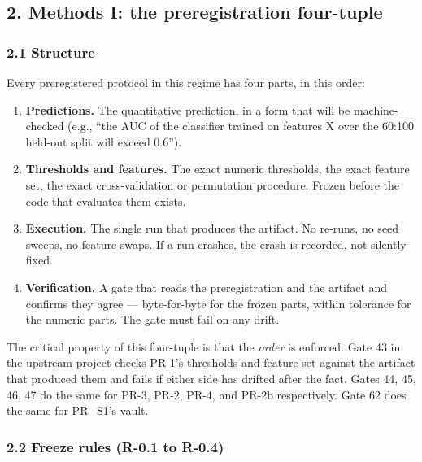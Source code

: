 \documentclass[
]{article}
\providecommand{\tightlist}{%
  \setlength{\itemsep}{0pt}\setlength{\parskip}{0pt}}
\begin{document}
\subsection{2. Methods I: the preregistration
four-tuple}\label{methods-i-the-preregistration-four-tuple}

\subsubsection{2.1 Structure}\label{structure}

Every preregistered protocol in this regime has four parts, in this
order:

\begin{enumerate}
\def\labelenumi{\arabic{enumi}.}
\tightlist
\item
  \textbf{Predictions.} The quantitative prediction, in a form that will
  be machine-checked (e.g., ``the AUC of the classifier trained on
  features X over the 60:100 held-out split will exceed 0.6'').
\item
  \textbf{Thresholds and features.} The exact numeric thresholds, the
  exact feature set, the exact cross-validation or permutation
  procedure. Frozen before the code that evaluates them exists.
\item
  \textbf{Execution.} The single run that produces the artifact. No
  re-runs, no seed sweeps, no feature swaps. If a run crashes, the crash
  is recorded, not silently fixed.
\item
  \textbf{Verification.} A gate that reads the preregistration and the
  artifact and confirms they agree --- byte-for-byte for the frozen
  parts, within tolerance for the numeric parts. The gate must fail on
  any drift.
\end{enumerate}

The critical property of this four-tuple is that the \emph{order} is
enforced. Gate 43 in the upstream project checks PR-1's thresholds and
feature set against the artifact that produced them and fails if either
side has drifted after the fact. Gates 44, 45, 46, 47 do the same for
PR-3, PR-2, PR-4, and PR-2b respectively. Gate 62 does the same for
PR\_S1's vault.

\subsubsection{2.2 Freeze rules (R-0.1 to
R-0.4)}\label{freeze-rules-r-0.1-to-r-0.4}
\end{document}
